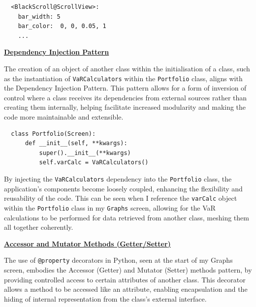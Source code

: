 \documentclass{article}
\begin{document}
\begin{verbatim}
  <BlackScroll@ScrollView>:
    bar_width: 5
    bar_color:  0, 0, 0.05, 1
    ...
\end{verbatim}

\vspace{0.3cm}
\underline{\textbf{Dependency Injection Pattern}}\\\vspace{0.3cm}

The creation of an object of another class within the initialisation of a class, such as the instantiation of \texttt{VaRCalculators} within the \texttt{Portfolio} class, aligns with the Dependency Injection Pattern. This pattern allows for a form of inversion of control where a class receives its dependencies from external sources rather than creating them internally, helping facilitate increased modularity and making the code more maintainable and extensible.

\begin{verbatim}
  class Portfolio(Screen):
      def __init__(self, **kwargs):
          super().__init__(**kwargs)
          self.varCalc = VaRCalculators() 
\end{verbatim}

\vspace{0.3cm}
By injecting the \texttt{VaRCalculators} dependency into the \texttt{Portfolio} class, the application's components become loosely coupled, enhancing the flexibility and reusability of the code. This can be seen when I reference the \texttt{varCalc} object within the \texttt{Portfolio} class in my \texttt{Graphs} screen, allowing for the VaR calculations to be performed for data retrieved from another class, meshing them all together coherently.\\\vspace{0.3cm}

\vspace{0.3cm}
\underline{\textbf{Accessor and Mutator Methods (Getter/Setter)}}\\\vspace{0.3cm}

The use of \texttt{@property} decorators in Python, seen at the start of my Graphs screen, embodies the Accessor (Getter) and Mutator (Setter) methods pattern, by providing controlled access to certain attributes of another class. This decorator allows a method to be accessed like an attribute, enabling encapsulation and the hiding of internal representation from the class's external interface.\\\vspace{0.3cm}
\end{document}
